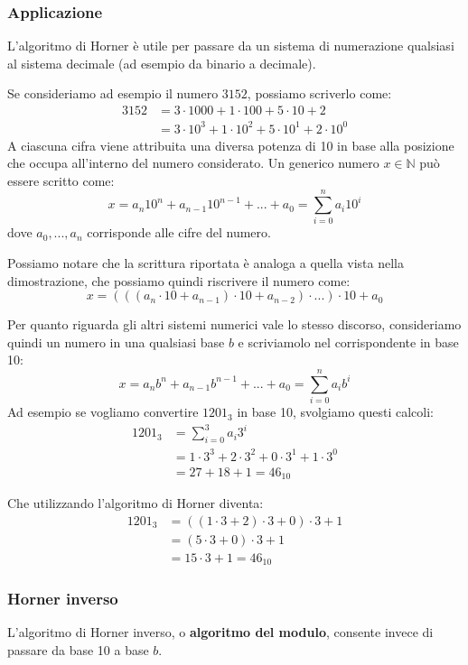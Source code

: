 \documentclass[../main.tex]{subfiles}
\begin{document}
\pagebreak
\subsubsection{Applicazione}
L'algoritmo di Horner è utile per passare da un sistema di numerazione qualsiasi al sistema decimale (ad esempio da binario a decimale).

Se consideriamo ad esempio il numero $3152$, possiamo scriverlo come:
\begin{align*}
    3152  &= 3 \cdot 1000 + 1 \cdot 100 + 5 \cdot 10 + 2 \\
    &= 3 \cdot 10^3 + 1 \cdot 10^2 + 5 \cdot 10^1 + 2 \cdot 10^0
\end{align*}
A ciascuna cifra viene attribuita una diversa potenza di 10 in base alla posizione che occupa all'interno del numero considerato. Un generico numero $x \in \mathbb{N}$ può essere scritto come:
$$
    x = a_n10^n + a_{n-1}10^{n-1} + ... + a_0 = \sum_{i=0}^{n} a_i10^i
$$
dove $a_0,...,a_n$ corrisponde alle cifre del numero.

Possiamo notare che la scrittura riportata è analoga a quella vista nella dimostrazione, che possiamo quindi riscrivere il numero come:
$$
    x = (((a_n \cdot 10 + a_{n-1}) \cdot 10 + a_{n-2}) \cdot ...) \cdot 10 + a_0
$$

Per quanto riguarda gli altri sistemi numerici vale lo stesso discorso, consideriamo quindi un numero in una qualsiasi base $b$ e scriviamolo nel corrispondente in base 10:
$$
    x = a_nb^n + a_{n-1}b^{n-1} + ... + a_0 = \sum_{i=0}^{n} a_ib^i
$$
Ad esempio se vogliamo convertire $1201_3$ in base 10, svolgiamo questi calcoli:
\begin{align*}
    1201_3 &= \sum_{i=0}^{3} a_i3^i \\
    &=1 \cdot 3^3 + 2 \cdot 3^2 + 0 \cdot 3^1 + 1 \cdot 3^0 \\
    &=27 + 18 + 1 = 46_{10}
\end{align*}

Che utilizzando l'algoritmo di Horner diventa:
\begin{align*}
    1201_3 &= ((1 \cdot 3 + 2) \cdot 3 + 0) \cdot 3 + 1 \\
    &= (5 \cdot 3 + 0) \cdot 3 + 1 \\
    &= 15 \cdot 3 + 1 = 46_{10}
\end{align*}

\subsubsection{Horner inverso}
L'algoritmo di Horner inverso, o \textbf{algoritmo del modulo}, consente invece di passare da base 10 a base $b$.
\end{document}

